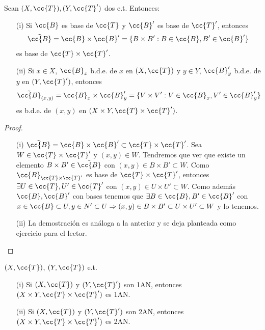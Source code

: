 \begin{prop}
    Sean $(X, \cc{T}), (Y, \cc{T}')$ dos e.t. Entonces:
    \begin{enumerate}
        \item[(i)] Si $\cc{B}$ es base de $\cc{T}$ y $\cc{B}'$ es base de $\cc{T}'$, entonces 
        \begin{align*}
            \tilde{\cc{B}}=\cc{B}\times \cc{B}'=\{B\times B': B\in \cc{B}, B'\in \cc{B}'\}
        \end{align*}
        es base de $\cc{T}\times \cc{T}'$.
        \item[(ii)] Si $x\in X$, $\cc{B}_x$ b.d.e. de $x$ en $(X, \cc{T})$ y $y\in Y$, $\cc{B}_y'$ b.d.e. de $y$ en $(Y, \cc{T}')$, entonces
        \begin{gather*}
            \tilde{\cc{B}}_{(x,y)}=\cc{B}_x\times \cc{B}_y' =\{V\times V': V\in \cc{B}_x, V'\in \cc{B}_y'\}
        \end{gather*}
        es b.d.e. de $(x,y)$ en $(X\times Y, \cc{T}\times \cc{T}')$.
    \end{enumerate}
    \begin{proof}\
        \begin{enumerate}
            \item[(i)] $\tilde{\cc{B}}=\cc{B}\times \cc{B}'\subset \cc{T}\times \cc{T}'$. Sea $W\in \cc{T}\times \cc{T}'$ y $(x,y)\in W$. Tendremos que ver que existe un elemento $B\times B'\in \tilde{\cc{B}}$ con $(x,y)\in B\times B'\subset W$. Como $\cc{B}_{\cc{T}\times \cc{T}'}$ es base de $\cc{T}\times \cc{T}'$, entonces $\exists U\in \cc{T}, U'\in \cc{T}'$ con $(x,y)\in U\times U'\subset W$. Como además $\cc{B}, \cc{B}'$ con bases tenemos que $\exists B\in \cc{B}, B'\in \cc{B}'$ con $x\in \cc{B}\subset U, y \in N'\subset U\Rightarrow (x,y)\in B\times B'\subset U\times U'\subset W$ y lo tenemos.
            \item[(ii)] La demostración es análoga a la anterior y se deja planteada como ejercicio para el lector.
        \end{enumerate}
    \end{proof}
\end{prop}

\begin{coro}
    $(X, \cc{T})$, $(Y, \cc{T})$ e.t.
    \begin{enumerate}
        \item[(i)] Si $(X, \cc{T})$ y $(Y, \cc{T}')$ son 1AN, entonces $(X\times Y, \cc{T}\times \cc{T}')$ es 1AN.
        \item[(ii)] Si $(X, \cc{T})$ y $(Y, \cc{T}')$ son 2AN, entonces $(X\times Y, \cc{T}\times \cc{T}')$ es 2AN.
    \end{enumerate}
    \endsquare
\end{coro}

